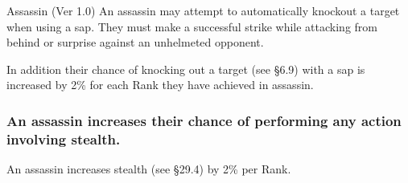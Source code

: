 \begin{Chapter}{Assassin (Ver 1.0)}
An assassin may attempt to automatically knockout a target when using
a sap.  They must make a successful strike while attacking from behind
or surprise against an unhelmeted opponent.

In addition their chance of knocking out a target (see §6.9) with a
sap is increased by 2\% for each Rank they have achieved in assassin.

\subsubsection{An assassin increases their chance of performing any action involving
stealth.}

An assassin increases stealth (see §29.4) by 2\% per Rank.

\end{Chapter}
